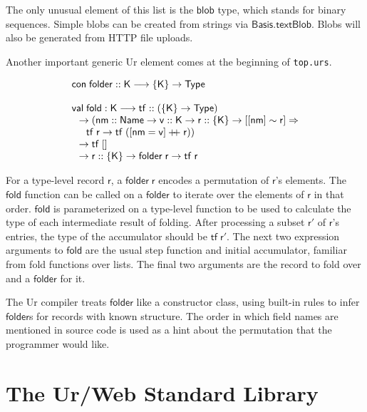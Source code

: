 \documentclass{article}
\newcommand{\mt}[1]{\mathsf{#1}}
\newcommand{\rc}{+ \hspace{-.075in} + \;}
\begin{document}
The only unusual element of this list is the $\mt{blob}$ type, which stands for binary sequences.  Simple blobs can be created from strings via $\mt{Basis.textBlob}$.  Blobs will also be generated from HTTP file uploads.

Another important generic Ur element comes at the beginning of \texttt{top.urs}.

$$\begin{array}{l}
  \mt{con} \; \mt{folder} :: \mt{K} \longrightarrow \{\mt{K}\} \to \mt{Type} \\
  \\
  \mt{val} \; \mt{fold} : \mt{K} \longrightarrow \mt{tf} :: (\{\mt{K}\} \to \mt{Type}) \\
  \hspace{.1in} \to (\mt{nm} :: \mt{Name} \to \mt{v} :: \mt{K} \to \mt{r} :: \{\mt{K}\} \to [[\mt{nm}] \sim \mt{r}] \Rightarrow \\
  \hspace{.2in} \mt{tf} \; \mt{r} \to \mt{tf} \; ([\mt{nm} = \mt{v}] \rc \mt{r})) \\
  \hspace{.1in} \to \mt{tf} \; [] \\
  \hspace{.1in} \to \mt{r} :: \{\mt{K}\} \to \mt{folder} \; \mt{r} \to \mt{tf} \; \mt{r}
\end{array}$$

For a type-level record $\mt{r}$, a $\mt{folder} \; \mt{r}$ encodes a permutation of $\mt{r}$'s elements.  The $\mt{fold}$ function can be called on a $\mt{folder}$ to iterate over the elements of $\mt{r}$ in that order.  $\mt{fold}$ is parameterized on a type-level function to be used to calculate the type of each intermediate result of folding.  After processing a subset $\mt{r'}$ of $\mt{r}$'s entries, the type of the accumulator should be $\mt{tf} \; \mt{r'}$.  The next two expression arguments to $\mt{fold}$ are the usual step function and initial accumulator, familiar from fold functions over lists.  The final two arguments are the record to fold over and a $\mt{folder}$ for it.

The Ur compiler treats $\mt{folder}$ like a constructor class, using built-in rules to infer $\mt{folder}$s for records with known structure.  The order in which field names are mentioned in source code is used as a hint about the permutation that the programmer would like.


\section{The Ur/Web Standard Library}
\end{document}
